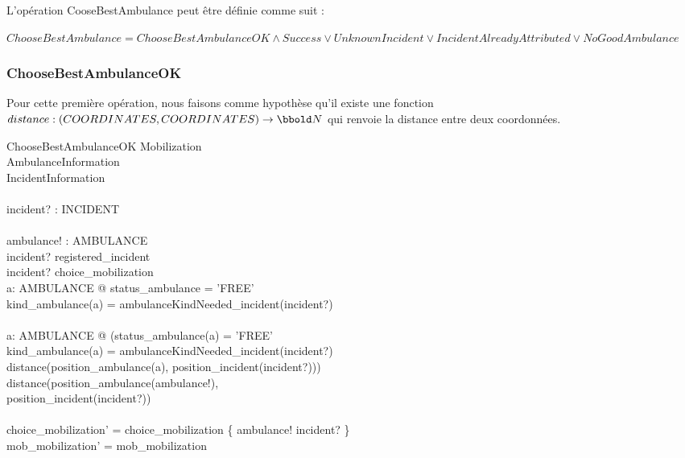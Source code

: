 \documentclass[12pt]{article}
\begin{document}
L'opération CooseBestAmbulance peut être définie comme suit :

	$ChooseBestAmbulance = ChooseBestAmbulanceOK \land Success \lor
	 UnknownIncident \lor IncidentAlreadyAttributed \lor NoGoodAmbulance$

\subsubsection{ChooseBestAmbulanceOK}

Pour cette première opération, nous faisons comme hypothèse qu'il existe une
fonction $distance : (COORDINATES, COORDINATES) \rightarrow \nat$ qui renvoie la 
distance entre deux coordonnées.

\begin{schema}{ChooseBestAmbulanceOK}
	\Delta Mobilization 	\\
	\Xi AmbulanceInformation\\
	\Xi IncidentInformation	\\
	\newline				\\
	incident? : INCIDENT	\\
	\newline				\\
	ambulance! : AMBULANCE	\\
  \where
  	incident? \in registered\_incident \\
  	incident? \notin \ran choice\_mobilization \\
  	\exists a: AMBULANCE @ status\_ambulance = 'FREE' \land \\
  	 kind\_ambulance(a) = ambulanceKindNeeded\_incident(incident?) \\
  	\newline \\
  	\forall a: AMBULANCE @ (status\_ambulance(a) = 'FREE' \land \\
  	 kind\_ambulance(a) = ambulanceKindNeeded\_incident(incident?) \land \\
  	 distance(position\_ambulance(a), position\_incident(incident?))) \\
  	 \geq distance(position\_ambulance(ambulance!), \\
  	 position\_incident(incident?))\\
  	\newline \\
  	choice\_mobilization' = choice\_mobilization \oplus \{ ambulance! \mapsto incident? \} \\
  	mob\_mobilization' = mob\_mobilization
\end{schema}
\end{document}
